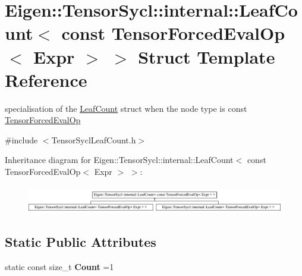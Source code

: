 \hypertarget{struct_eigen_1_1_tensor_sycl_1_1internal_1_1_leaf_count_3_01const_01_tensor_forced_eval_op_3_01_expr_01_4_01_4}{}\section{Eigen\+:\+:Tensor\+Sycl\+:\+:internal\+:\+:Leaf\+Count$<$ const Tensor\+Forced\+Eval\+Op$<$ Expr $>$ $>$ Struct Template Reference}
\label{struct_eigen_1_1_tensor_sycl_1_1internal_1_1_leaf_count_3_01const_01_tensor_forced_eval_op_3_01_expr_01_4_01_4}


specialisation of the \hyperlink{struct_eigen_1_1_tensor_sycl_1_1internal_1_1_leaf_count}{Leaf\+Count} struct when the node type is const \hyperlink{class_eigen_1_1_tensor_forced_eval_op}{Tensor\+Forced\+Eval\+Op}  




{\ttfamily \#include $<$Tensor\+Sycl\+Leaf\+Count.\+h$>$}

Inheritance diagram for Eigen\+:\+:Tensor\+Sycl\+:\+:internal\+:\+:Leaf\+Count$<$ const Tensor\+Forced\+Eval\+Op$<$ Expr $>$ $>$\+:\begin{figure}[H]
\begin{center}
\leavevmode
\includegraphics[height=1.204301cm]{struct_eigen_1_1_tensor_sycl_1_1internal_1_1_leaf_count_3_01const_01_tensor_forced_eval_op_3_01_expr_01_4_01_4}
\end{center}
\end{figure}
\subsection*{Static Public Attributes}
\begin{DoxyCompactItemize}
\item 
\mbox{\label{struct_eigen_1_1_tensor_sycl_1_1internal_1_1_leaf_count_3_01const_01_tensor_forced_eval_op_3_01_expr_01_4_01_4_a0deb3312a8c6fc03074ef5e637e6c2b1}} 
static const size\+\_\+t {\bfseries Count} =1
\end{DoxyCompactItemize}


